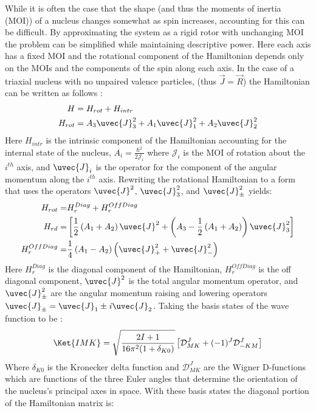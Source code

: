 While it is often the case that the shape (and thus the moments of inertia (MOI)) of a nucleus changes somewhat as spin increases, accounting for this can be difficult. By approximating the system as a rigid rotor with unchanging MOI the problem can be simplified while maintaining descriptive power. Here each axis has a fixed MOI and the rotational component of the Hamiltonian depends only on the MOIs and the components of the spin along each axis. In the case of a triaxial nucleus with no unpaired valence particles, (thus $\vec{J}=\vec{R}$) the Hamiltonian can be written as follows \cite{triaxRotorSol,wobblingGeometry}:
\begin{align}
\label{eqn:chp2-triaxial-rotor-hamiltonian}
H &= H_{rot} + H_{intr} \\
H_{rot}&=A_3\uvec{J}_3^2 + A_1\uvec{J}_1^2 + A_2\uvec{J}_2^2
\end{align}
Here $H_{intr}$ is the intrinsic component of the Hamiltonian accounting for the internal state of the nucleus, $A_i = \frac{\hbar^2}{2 \mathcal{J}_i}$ where $\mathcal{J}_i$ is the MOI of rotation about the $i^{th}$ axis, and $\uvec{J}_i$ is the operator for the component of the angular momentum along the $i^{th}$ axis. Rewriting the rotational Hamiltonian to a form that uses the operators $\uvec{J}^2$, $\uvec{J}^2_3$, and $\uvec{J}^2_{\pm}$ yields:
\begin{align}
\label{eqn:chp2-triaxial-rotor-hamiltonian-rewrite}
H_{rot}=& H_{r}^{Diag} + H_{r}^{OffDiag}\\
H_{rd}=&\left[\frac{1}{2}\left(A_1+A_2\right)\uvec{J}^2 + \left(A_3-\frac{1}{2}\left(A_1+A_2\right)\right)\uvec{J}^2_3\right]\nonumber\\
H_{r}^{OffDiag}=&\frac{1}{4}\left(A_1-A_2\right)\left(\uvec{J}^2_++\uvec{J}^2_-\right) \nonumber
\end{align}
Here $H_{r}^{Diag}$ is the diagonal component of the Hamiltonian, $H_{r}^{OffDiag}$ is the off diagonal component, $\uvec{J}^2$ is the total angular momentum operator, and $\uvec{J}^2_{\pm}$ are the angular momentum raising and lowering operators $\uvec{J}_{\pm} = \uvec{J}_1\pm\mathit{i}\uvec{J}_2$. Taking the basis states of the wave function to be \cite{triaxRotorSol}:
\begin{equation}
\label{eqn:chp2-triaxial-rotor-basis}
\Ket{IMK}= \sqrt{\frac{2I+1}{16\pi^{2}(1+\delta_{K0})}} \left[\mathcal{D}^{J}_{MK} + (-1)^J \mathcal{D}^{J}_{-KM}\right]
\end{equation}
Where $\delta_{K0}$ is the Kronecker delta function and $\mathcal{D}^{J}_{MK}$ are the Wigner D-functions which are functions of the three Euler angles that determine the orientation of the nucleus's principal axes in space. With these basis states the diagonal portion of the Hamiltonian matrix is:
